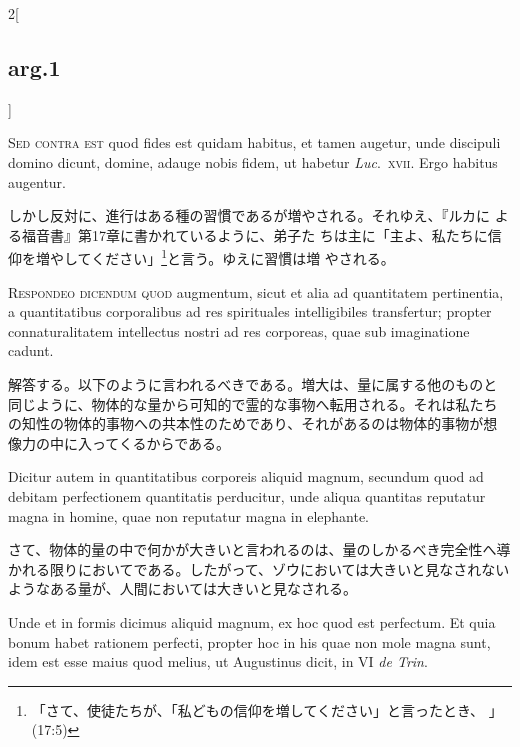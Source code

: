 \documentclass[paper=a4paper,fontsize=10pt,jafontsize=9pt,titlepage]{jlreq}
\begin{document}
\begin{paracol}{2}[\subsection{arg.1}]
\switchcolumn*[\subsection{s.c.}]

{\scshape Sed contra est} quod fides est quidam habitus, et tamen augetur, unde
discipuli domino dicunt, domine, adauge nobis fidem, ut habetur
{\itshape Luc}.~{\scshape xvii}. Ergo habitus augentur.

\switchcolumn

しかし反対に、進行はある種の習慣であるが増やされる。それゆえ、『ルカに
よる福音書』第17章に書かれているように、弟子た
ちは主に「主よ、私たちに信仰を増やしてください」\footnote{「さて、使徒たちが、「私どもの信仰を増してください」と言ったとき、 」(17:5)}と言う。ゆえに習慣は増
やされる。


{\scshape Respondeo dicendum quod} augmentum, sicut et alia ad quantitatem
pertinentia, a quantitatibus corporalibus ad res spirituales
intelligibiles transfertur; propter connaturalitatem intellectus
nostri ad res corporeas, quae sub imaginatione cadunt.

\switchcolumn

解答する。以下のように言われるべきである。増大は、量に属する他のものと
同じように、物体的な量から可知的で霊的な事物へ転用される。それは私たち
の知性の物体的事物への共本性のためであり、それがあるのは物体的事物が想
像力の中に入ってくるからである。

\switchcolumn*

Dicitur autem
in quantitatibus corporeis aliquid magnum, secundum quod ad debitam
perfectionem quantitatis perducitur, unde aliqua quantitas reputatur
magna in homine, quae non reputatur magna in elephante.

\switchcolumn

さて、物体的量の中で何かが大きいと言われるのは、量のしかるべき完全性へ導かれる限りにおいてである。したがって、ゾウにおいては大きいと見なされないようなある量が、人間においては大きいと見なされる。

\switchcolumn*

Unde et in
formis dicimus aliquid magnum, ex hoc quod est perfectum. Et quia
bonum habet rationem perfecti, propter hoc in his quae non mole magna
sunt, idem est esse maius quod melius, ut Augustinus dicit, in VI {\itshape de
Trin}.


\end{paracol}
\end{document}
